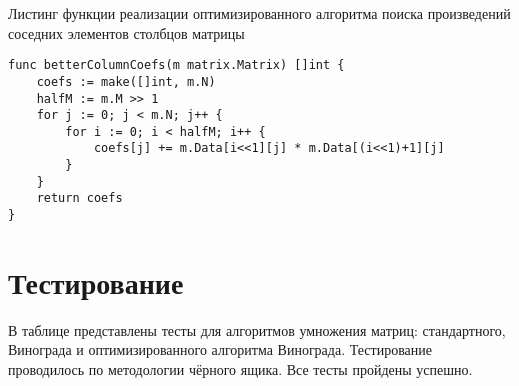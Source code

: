 \begin{code}
\caption{Листинг функции реализации оптимизированного алгоритма поиска произведений соседних элементов столбцов матрицы}
\label{code:ccBetter}
\begin{verbatim}
func betterColumnCoefs(m matrix.Matrix) []int {
	coefs := make([]int, m.N)
	halfM := m.M >> 1
	for j := 0; j < m.N; j++ {
		for i := 0; i < halfM; i++ {
			coefs[j] += m.Data[i<<1][j] * m.Data[(i<<1)+1][j]
		}
	}
	return coefs
}
\end{verbatim}
\end{code}

\newpage

\section{Тестирование}
В таблице  представлены тесты для алгоритмов умножения матриц: стандартного, Винограда и оптимизированного алгоритма Винограда. Тестирование проводилось по методологии чёрного ящика. Все тесты пройдены успешно.


